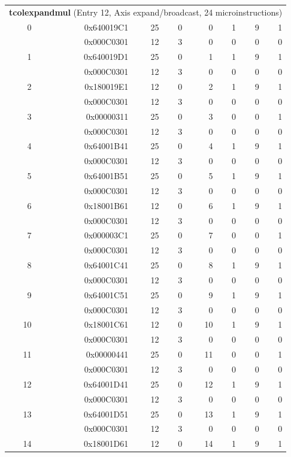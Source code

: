 \begin{longtable}{r r r r r r r r}
\multicolumn{8}{l}{\textbf{tcolexpandmul} (Entry 12, Axis expand/broadcast, 24 microinstructions)} \\
0 & 0x640019C1 & 25 & 0 & 0 & 1 & 9 & 1 \\
  & 0x000C0301 & 12 & 3 & 0 & 0 & 0 & 0 \\
1 & 0x640019D1 & 25 & 0 & 1 & 1 & 9 & 1 \\
  & 0x000C0301 & 12 & 3 & 0 & 0 & 0 & 0 \\
2 & 0x180019E1 & 12 & 0 & 2 & 1 & 9 & 1 \\
  & 0x000C0301 & 12 & 3 & 0 & 0 & 0 & 0 \\
3 & 0x00000311 & 25 & 0 & 3 & 0 & 0 & 1 \\
  & 0x000C0301 & 12 & 3 & 0 & 0 & 0 & 0 \\
4 & 0x64001B41 & 25 & 0 & 4 & 1 & 9 & 1 \\
  & 0x000C0301 & 12 & 3 & 0 & 0 & 0 & 0 \\
5 & 0x64001B51 & 25 & 0 & 5 & 1 & 9 & 1 \\
  & 0x000C0301 & 12 & 3 & 0 & 0 & 0 & 0 \\
6 & 0x18001B61 & 12 & 0 & 6 & 1 & 9 & 1 \\
  & 0x000C0301 & 12 & 3 & 0 & 0 & 0 & 0 \\
7 & 0x000003C1 & 25 & 0 & 7 & 0 & 0 & 1 \\
  & 0x000C0301 & 12 & 3 & 0 & 0 & 0 & 0 \\
8 & 0x64001C41 & 25 & 0 & 8 & 1 & 9 & 1 \\
  & 0x000C0301 & 12 & 3 & 0 & 0 & 0 & 0 \\
9 & 0x64001C51 & 25 & 0 & 9 & 1 & 9 & 1 \\
  & 0x000C0301 & 12 & 3 & 0 & 0 & 0 & 0 \\
10 & 0x18001C61 & 12 & 0 & 10 & 1 & 9 & 1 \\
  & 0x000C0301 & 12 & 3 & 0 & 0 & 0 & 0 \\
11 & 0x00000441 & 25 & 0 & 11 & 0 & 0 & 1 \\
  & 0x000C0301 & 12 & 3 & 0 & 0 & 0 & 0 \\
12 & 0x64001D41 & 25 & 0 & 12 & 1 & 9 & 1 \\
  & 0x000C0301 & 12 & 3 & 0 & 0 & 0 & 0 \\
13 & 0x64001D51 & 25 & 0 & 13 & 1 & 9 & 1 \\
  & 0x000C0301 & 12 & 3 & 0 & 0 & 0 & 0 \\
14 & 0x18001D61 & 12 & 0 & 14 & 1 & 9 & 1 \\

\end{longtable}
